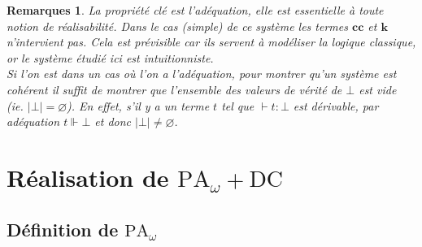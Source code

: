 \documentclass[a4paper,12pt]{article}
\theoremstyle{rmqstyle}
\newtheorem{rmqs}[theo]{Remarques}
\newcommand{\abs}[1]{\lvert#1\rvert}
\newcommand{\PA}{\mathrm{PA}}
\newcommand{\cc}{\mathbf{cc}}
\renewcommand{\k}{\mathbf{k}}
\newcommand{\DC}{\mathrm{DC}}
\begin{document}
\begin{rmqs} La propriété clé est l'adéquation, elle est essentielle à toute notion de réalisabilité. Dans le cas (simple) de ce système les termes $\cc$ et $\k$ n'intervient pas. Cela est prévisible car ils servent à modéliser la logique classique, or le système étudié ici est intuitionniste.\\
Si l'on est dans un cas où l'on a l'adéquation, pour montrer qu'un système est cohérent il suffit de montrer que l'ensemble des valeurs de vérité de $\bot$ est vide (ie. $\abs{\bot} = \varnothing$). En effet, s'il y a un terme $t$ tel que $\vdash t : \bot$ est dérivable, par adéquation $t \Vdash \bot$ et donc $\abs{\bot} \neq \varnothing$. 
\end{rmqs}

\clearpage

\section{Réalisation de \( \PA_\omega +  \DC\)}
\label{sec 2}

\subsection{Définition de \( \PA_\omega \)}
\end{document}
